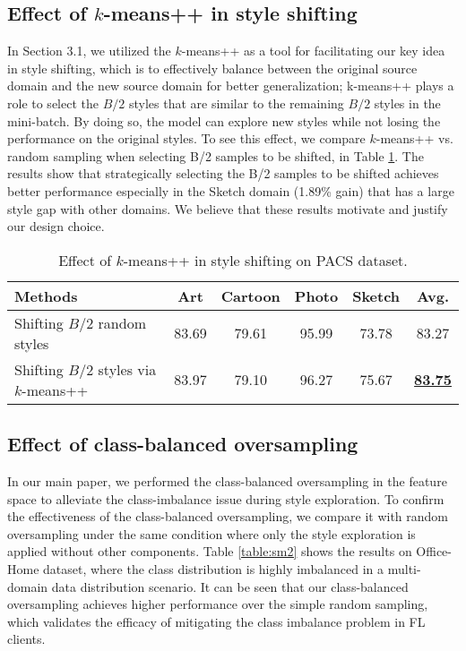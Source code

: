 \documentclass{article}
\theoremstyle{plain}
\theoremstyle{definition}
\theoremstyle{remark}
\begin{document}
\subsection{Effect of $k$-means++ in style shifting}
In Section 3.1, we utilized the $k$-means++ as a tool for facilitating our key idea in style shifting, which is to effectively balance between the original source domain and the new source domain for better generalization; k-means++ plays a role to select the $B/2$ styles that are similar to the remaining $B/2$ styles in the mini-batch. By doing so, the model can explore new styles while not losing the performance on the original styles. To see this effect, we compare $k$-means++ vs. random sampling when selecting B/2 samples to be shifted, in Table \ref{table:effectkmeans}. The results show that strategically selecting the B/2 samples to be shifted achieves better performance especially in the Sketch domain (1.89\% gain) that has a large style gap with other domains. We believe that these results motivate and justify our design choice.

\begin{table}[!h]
\small
\centering
	\begin{tabular}{l|    cccc | c}
		\toprule  
		Methods   &Art  & Cartoon & Photo & Sketch & Avg. \\ 
		\midrule	
		Shifting $B/2$ random styles &83.69& 79.61& 95.99& 73.78& 83.27\\	
		Shifting $B/2$ styles via $k$-means++ &83.97& 79.10& 96.27& 75.67& \textbf{\underline{83.75}}  \\
		\bottomrule
	\end{tabular}
\vspace{+3mm}
\caption{Effect of $k$-means++ in style shifting  on  PACS dataset. } 
\label{table:effectkmeans}
\end{table} 



\subsection{Effect of class-balanced oversampling}
In our main paper, we performed the class-balanced oversampling in the feature space to alleviate the class-imbalance issue   during style exploration. To confirm the effectiveness of the class-balanced oversampling, we compare it with random oversampling under the same condition where only the style exploration is applied without other components. Table \ref{table:sm2} shows the results on Office-Home dataset, where the class distribution is highly imbalanced in a multi-domain data distribution scenario. It can be seen that our class-balanced oversampling achieves higher performance over the simple random sampling, which validates the efficacy of mitigating the class imbalance problem in FL clients.
\end{document}
